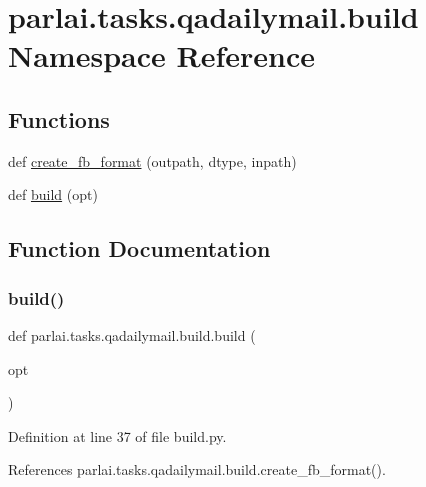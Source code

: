 \hypertarget{namespaceparlai_1_1tasks_1_1qadailymail_1_1build}{}\section{parlai.\+tasks.\+qadailymail.\+build Namespace Reference}
\label{namespaceparlai_1_1tasks_1_1qadailymail_1_1build}
\subsection*{Functions}
\begin{DoxyCompactItemize}
\item 
def \hyperlink{namespaceparlai_1_1tasks_1_1qadailymail_1_1build_a91296a105f8b2d3f5c53d34282cf6e62}{create\+\_\+fb\+\_\+format} (outpath, dtype, inpath)
\item 
def \hyperlink{namespaceparlai_1_1tasks_1_1qadailymail_1_1build_ac5d9b858a94d4fe241cd57a6fd0ccf1c}{build} (opt)
\end{DoxyCompactItemize}


\subsection{Function Documentation}
\mbox{\label{namespaceparlai_1_1tasks_1_1qadailymail_1_1build_ac5d9b858a94d4fe241cd57a6fd0ccf1c}} 
\subsubsection{\texorpdfstring{build()}{build()}}
{\footnotesize\ttfamily def parlai.\+tasks.\+qadailymail.\+build.\+build (\begin{DoxyParamCaption}\item[{}]{opt }\end{DoxyParamCaption})}



Definition at line 37 of file build.\+py.



References parlai.\+tasks.\+qadailymail.\+build.\+create\+\_\+fb\+\_\+format().

